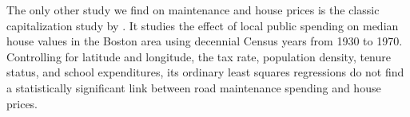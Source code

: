 
The only other study we find on maintenance and house prices is the classic capitalization study by \cite{edel1974taxes}. It studies the effect of local public spending on median house values in the Boston area using decennial Census years from 1930 to 1970. Controlling for latitude and longitude, the tax rate, population density, tenure status, and school expenditures, its ordinary least squares regressions do not find a statistically significant link between road maintenance spending and house prices.


